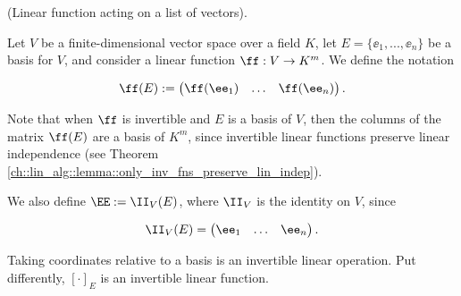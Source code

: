 \begin{defn}
\label{ch::lin_alg::defn::linear_fn_acts_on_vectors}

    (Linear function acting on a list of vectors).
    
     Let $V$ be a finite-dimensional vector space over a field $K$, let $E = \{\ee_1, ..., \ee_n\}$ be a basis for $V$, and consider a linear function $\ff:V \rightarrow K^m$. We define the notation
    
    \begin{align*}
        \ff(E) := \begin{pmatrix} \ff(\ee_1) & \hdots & \ff(\ee_n) \end{pmatrix}.
    \end{align*}
    
    Note that when $\ff$ is invertible and $E$ is a basis of $V$, then the columns of the matrix $\ff(E)$ are a basis of $K^m$, since invertible linear functions preserve linear independence (see Theorem \ref{ch::lin_alg::lemma::only_inv_fns_preserve_lin_indep}).
    
    We also define $\EE := \II_V(E)$, where $\II_V$ is the identity on $V$, since
    
    \begin{align*}
        \II_V(E) = \begin{pmatrix} \ee_1 & \hdots & \ee_n \end{pmatrix}.
    \end{align*}

\end{defn}

\begin{theorem}
    Taking coordinates relative to a basis is an invertible linear operation. Put differently, $[\cdot]_E$ is an invertible linear function.
\end{theorem}

